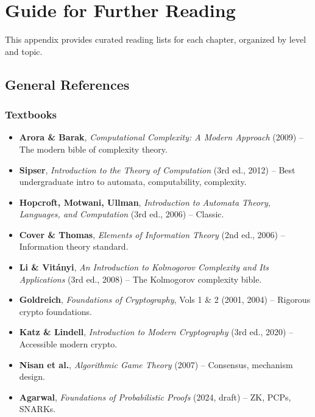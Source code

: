 
\chapter{Guide for Further Reading}
\label{app:further}
This appendix provides curated reading lists for each chapter, organized by level and topic.

\section{General References}

\subsection{Textbooks}
\begin{itemize}
\item \textbf{Arora \& Barak}, \emph{Computational Complexity: A Modern Approach} (2009) -- The modern bible of complexity theory.
\item \textbf{Sipser}, \emph{Introduction to the Theory of Computation} (3rd ed., 2012) -- Best undergraduate intro to automata, computability, complexity.
\item \textbf{Hopcroft, Motwani, Ullman}, \emph{Introduction to Automata Theory, Languages, and Computation} (3rd ed., 2006) -- Classic.
\item \textbf{Cover \& Thomas}, \emph{Elements of Information Theory} (2nd ed., 2006) -- Information theory standard.
\item \textbf{Li \& Vit\'anyi}, \emph{An Introduction to Kolmogorov Complexity and Its Applications} (3rd ed., 2008) -- The Kolmogorov complexity bible.
\item \textbf{Goldreich}, \emph{Foundations of Cryptography}, Vols 1 \& 2 (2001, 2004) -- Rigorous crypto foundations.
\item \textbf{Katz \& Lindell}, \emph{Introduction to Modern Cryptography} (3rd ed., 2020) -- Accessible modern crypto.
\item \textbf{Nisan et al.}, \emph{Algorithmic Game Theory} (2007) -- Consensus, mechanism design.
\item \textbf{Agarwal}, \emph{Foundations of Probabilistic Proofs} (2024, draft) -- ZK, PCPs, SNARKs.
\end{itemize}

